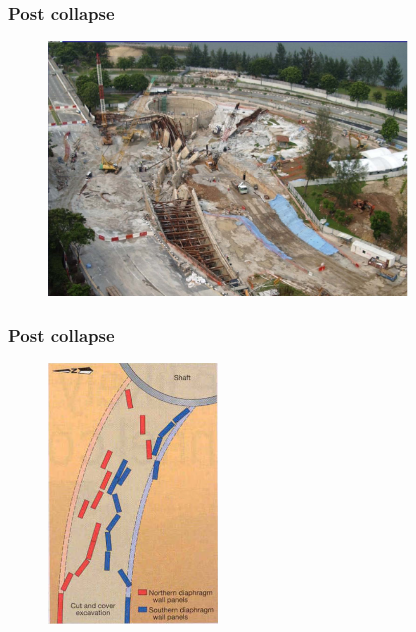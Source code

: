 \documentclass[notes]{beamer}
\begin{document}
\begin{frame}
\frametitle{Post collapse}
\begin{figure}[ht]
	\centering
	\includegraphics[width=0.85\textwidth]{figs/post-collapse.png}
\end{figure}
\end{frame}

\begin{frame}
\frametitle{Post collapse}
\begin{figure}[ht]
	\centering
	\includegraphics[width=0.4\textwidth]{figs/final-dwall-panels.png}
\end{figure}
\end{frame}
\end{document}
